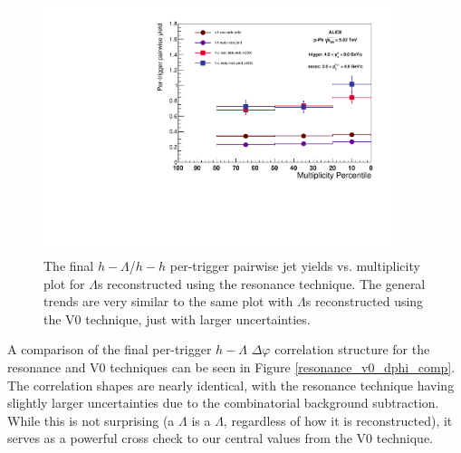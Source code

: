 \documentclass[ALICE,manyauthors]{ALICE_analysis_notes}
\begin{document}
\begin{figure}[ht]
\centering
\includegraphics[width=4in]{figures/resonance_pairwise_plot_2_4.pdf}
\caption{The final $h-\Lambda$/$h-h$ per-trigger pairwise jet yields vs. multiplicity plot for $\Lambda$s reconstructed using the resonance technique. The general trends are very similar to the same plot with $\Lambda$s reconstructed using the V0 technique, just with larger uncertainties.}
\label{final_pairwise_yields_resonance}
\end{figure}

A comparison of the final per-trigger $h-\Lambda$ $\Delta\varphi$ correlation structure for the resonance and V0 techniques can be seen in Figure \ref{resonance_v0_dphi_comp}. The correlation shapes are nearly identical, with the resonance technique having slightly larger uncertainties due to the combinatorial background subtraction. While this is not surprising (a $\Lambda$ is a $\Lambda$, regardless of how it is reconstructed), it serves as a powerful cross check to our central values from the V0 technique.
\end{document}
